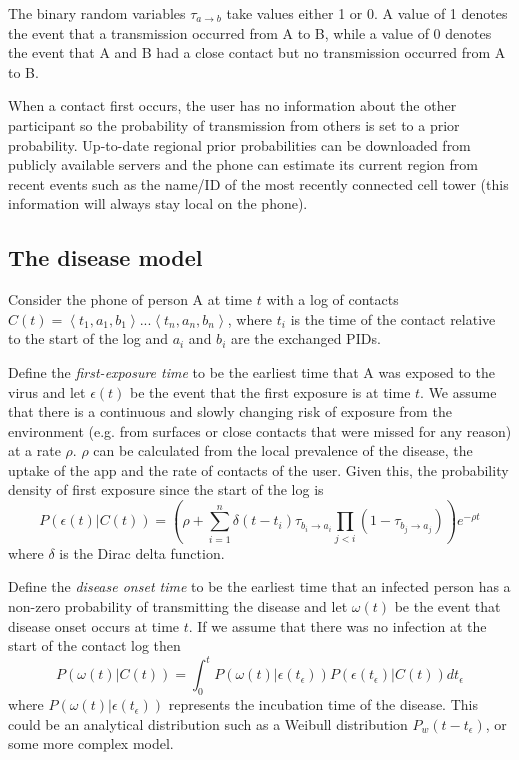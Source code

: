 \documentclass{article}
\begin{document}
The binary random variables $\tau_{a\rightarrow b}$ take values either 1 or 0. A value of 1 denotes the event that a transmission occurred from A to B, while a value of 0 denotes the event that A and B had a close contact but no transmission occurred from A to B.

When a contact first occurs, the user has no information about the other participant so the probability of transmission from others is set to a prior probability. Up-to-date regional prior probabilities can be downloaded from publicly available servers and the phone can estimate its current region from recent events such as the name/ID of the most recently connected cell tower (this information will always stay local on the phone).

\subsection{The disease model}

Consider the phone of person A at time $t$ with a log of contacts $C(t) = \left< t_{1},a_1,b_1 \right> ... \left< t_{n},a_n,b_n \right>$, where $t_i$ is the time of the contact relative to the start of the log and $a_i$ and $b_i$ are the exchanged PIDs.

Define the \textit{first-exposure time} to be the earliest time that A was exposed to the virus and let $\epsilon(t)$ be the event that the first exposure is at time $t$. We assume that there is a continuous and slowly changing risk of exposure from the environment (e.g. from surfaces or close contacts that were missed for any reason) at a rate $\rho$. $\rho$ can be calculated from the local prevalence of the disease, the uptake of the app and the rate of contacts of the user. Given this, the probability density of first exposure since the start of the log is
\begin{equation}
P\left(\epsilon(t)|C(t)\right) = \left(\rho + \sum_{i=1}^n \delta(t - t_i)\tau_{b_i\rightarrow a_i} \prod_{j<i}(1-\tau_{b_j\rightarrow a_j})\right) e^{-\rho t}
\label{firstExposure}
\end{equation}
where $\delta$ is the Dirac delta function.

Define the \textit{disease onset time} to be the earliest time that an infected person has a non-zero probability of transmitting the disease and let $\omega(t)$ be the event that disease onset occurs at time $t$. If we assume that there was no infection at the start of the contact log then
\[
P(\omega(t)|C(t)) = \int_0^{t} P(\omega(t)|\epsilon(t_\epsilon))P(\epsilon(t_\epsilon)|C(t)) dt_\epsilon
\]
where $P(\omega(t)|\epsilon(t_\epsilon))$ represents the incubation time of the disease. This could be an analytical distribution such as a Weibull distribution $P_w(t-t_\epsilon)$, or some more complex model.
\end{document}
